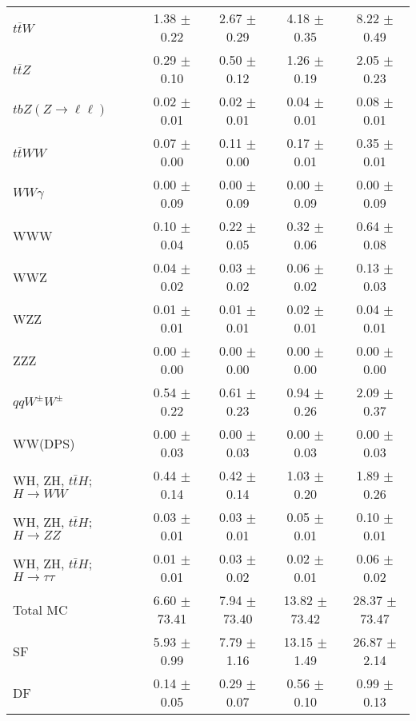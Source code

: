 \begin{tabular}{l|cccc}
                   $t\overline{t}W$ &  1.38 $\pm$  0.22 &  2.67 $\pm$  0.29 &  4.18 $\pm$  0.35 &  8.22 $\pm$  0.49 \\
                   $t\overline{t}Z$ &  0.29 $\pm$  0.10 &  0.50 $\pm$  0.12 &  1.26 $\pm$  0.19 &  2.05 $\pm$  0.23 \\
    $tbZ (Z \rightarrow \ell \ell)$ &  0.02 $\pm$  0.01 &  0.02 $\pm$  0.01 &  0.04 $\pm$  0.01 &  0.08 $\pm$  0.01 \\
                  $t\overline{t}WW$ &  0.07 $\pm$  0.00 &  0.11 $\pm$  0.00 &  0.17 $\pm$  0.01 &  0.35 $\pm$  0.01 \\
                         $WW\gamma$ &  0.00 $\pm$  0.09 &  0.00 $\pm$  0.09 &  0.00 $\pm$  0.09 &  0.00 $\pm$  0.09 \\
                                WWW &  0.10 $\pm$  0.04 &  0.22 $\pm$  0.05 &  0.32 $\pm$  0.06 &  0.64 $\pm$  0.08 \\
                                WWZ &  0.04 $\pm$  0.02 &  0.03 $\pm$  0.02 &  0.06 $\pm$  0.02 &  0.13 $\pm$  0.03 \\
                                WZZ &  0.01 $\pm$  0.01 &  0.01 $\pm$  0.01 &  0.02 $\pm$  0.01 &  0.04 $\pm$  0.01 \\
                                ZZZ &  0.00 $\pm$  0.00 &  0.00 $\pm$  0.00 &  0.00 $\pm$  0.00 &  0.00 $\pm$  0.00 \\
                 $qqW^{\pm}W^{\pm}$ &  0.54 $\pm$  0.22 &  0.61 $\pm$  0.23 &  0.94 $\pm$  0.26 &  2.09 $\pm$  0.37 \\
                            WW(DPS) &  0.00 $\pm$  0.03 &  0.00 $\pm$  0.03 &  0.00 $\pm$  0.03 &  0.00 $\pm$  0.03 \\
WH, ZH, $t\bar{t}H$; $H \rightarrow WW$ &  0.44 $\pm$  0.14 &  0.42 $\pm$  0.14 &  1.03 $\pm$  0.20 &  1.89 $\pm$  0.26 \\
WH, ZH, $t\bar{t}H$; $H \rightarrow ZZ$ &  0.03 $\pm$  0.01 &  0.03 $\pm$  0.01 &  0.05 $\pm$  0.01 &  0.10 $\pm$  0.01 \\
WH, ZH, $t\bar{t}H$; $H \rightarrow \tau\tau$ &  0.01 $\pm$  0.01 &  0.03 $\pm$  0.02 &  0.02 $\pm$  0.01 &  0.06 $\pm$  0.02 \\
\hline\hline
                           Total MC &  6.60 $\pm$ 73.41 &  7.94 $\pm$ 73.40 & 13.82 $\pm$ 73.42 & 28.37 $\pm$ 73.47 \\
\hline
                                 SF &  5.93 $\pm$  0.99 &  7.79 $\pm$  1.16 & 13.15 $\pm$  1.49 & 26.87 $\pm$  2.14 \\
                                 DF &  0.14 $\pm$  0.05 &  0.29 $\pm$  0.07 &  0.56 $\pm$  0.10 &  0.99 $\pm$  0.13 \\

\end{tabular}
